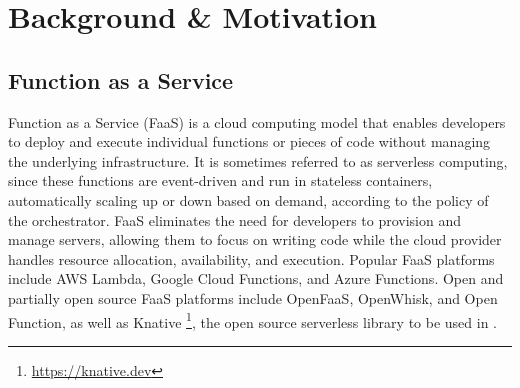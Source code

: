 \section{Background \& Motivation}
\label{sec:background}


\subsection{Function as a Service}
Function as a Service (FaaS) is a cloud computing model that enables developers to deploy and execute individual functions or pieces of code without managing the underlying infrastructure.
It is sometimes referred to as serverless computing, since
these functions are event-driven and run in stateless containers, automatically scaling up or down based on demand, according to the policy of the orchestrator.
FaaS eliminates the need for developers to provision and manage servers, allowing them to focus on writing code while the cloud provider handles resource allocation, availability, and execution.
Popular FaaS platforms include AWS Lambda, Google Cloud Functions, and Azure Functions.
Open and partially open source FaaS platforms include OpenFaaS, OpenWhisk, and Open Function, as well as Knative \footnote{\url{https://knative.dev}}, the open source serverless library to be used in \SystemName.

